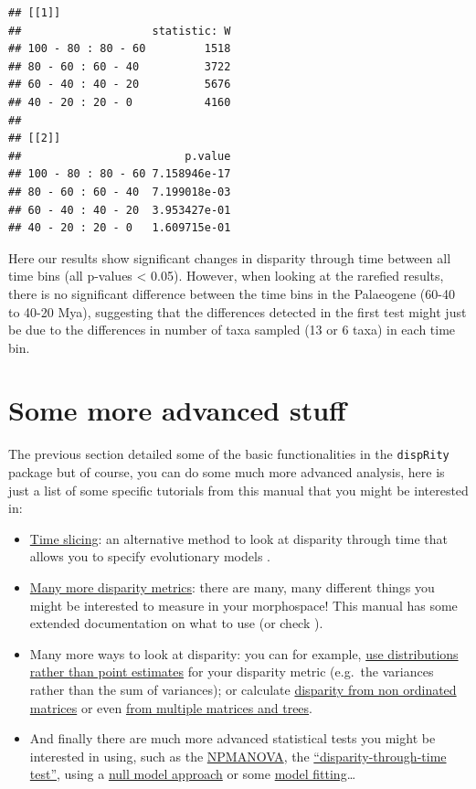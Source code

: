 \documentclass[
]{book}
\providecommand{\tightlist}{%
  \setlength{\itemsep}{0pt}\setlength{\parskip}{0pt}}
\begin{document}
\begin{verbatim}
## [[1]]
##                    statistic: W
## 100 - 80 : 80 - 60         1518
## 80 - 60 : 60 - 40          3722
## 60 - 40 : 40 - 20          5676
## 40 - 20 : 20 - 0           4160
## 
## [[2]]
##                         p.value
## 100 - 80 : 80 - 60 7.158946e-17
## 80 - 60 : 60 - 40  7.199018e-03
## 60 - 40 : 40 - 20  3.953427e-01
## 40 - 20 : 20 - 0   1.609715e-01
\end{verbatim}

Here our results show significant changes in disparity through time between all time bins (all p-values \textless{} 0.05).
However, when looking at the rarefied results, there is no significant difference between the time bins in the Palaeogene (60-40 to 40-20 Mya), suggesting that the differences detected in the first test might just be due to the differences in number of taxa sampled (13 or 6 taxa) in each time bin.

\hypertarget{some-more-advanced-stuff}{%
\section{Some more advanced stuff}\label{some-more-advanced-stuff}}

The previous section detailed some of the basic functionalities in the \texttt{dispRity} package but of course, you can do some much more advanced analysis, here is just a list of some specific tutorials from this manual that you might be interested in:

\begin{itemize}
\tightlist
\item
  \protect\hyperlink{time-slicing}{Time slicing}: an alternative method to look at disparity through time that allows you to specify evolutionary models \citep{time-slice}.
\item
  \protect\hyperlink{disparity-metrics}{Many more disparity metrics}: there are many, many different things you might be interested to measure in your morphospace! This manual has some extended documentation on what to use (or check \citet{moms}).
\item
  Many more ways to look at disparity: you can for example, \protect\hyperlink{disparity-distribution}{use distributions rather than point estimates} for your disparity metric (e.g.~the variances rather than the sum of variances); or calculate \protect\hyperlink{other-matrices}{disparity from non ordinated matrices} or even \protect\hyperlink{multi.input}{from multiple matrices and trees}.
\item
  And finally there are much more advanced statistical tests you might be interested in using, such as the \protect\hyperlink{adonis}{NPMANOVA}, the \protect\hyperlink{dtt}{``disparity-through-time test''}, using a \protect\hyperlink{null-test}{null model approach} or some \protect\hyperlink{model-fitting}{model fitting}\ldots{}
\end{itemize}
\end{document}
